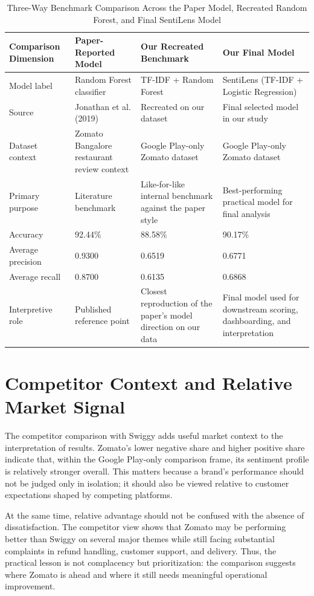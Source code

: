 \begin{table}[h]
\centering
\caption{Three-Way Benchmark Comparison Across the Paper Model, Recreated Random Forest, and Final SentiLens Model}
\small
\begin{tabular}{L{0.26\textwidth}L{0.18\textwidth}L{0.18\textwidth}L{0.20\textwidth}}
\toprule
\textbf{Comparison Dimension} & \textbf{Paper-Reported Model} & \textbf{Our Recreated Benchmark} & \textbf{Our Final Model} \\
\midrule
Model label & Random Forest classifier & TF-IDF + Random Forest & SentiLens (TF-IDF + Logistic Regression) \\
Source & Jonathan et al. (2019) & Recreated on our dataset & Final selected model in our study \\
Dataset context & Zomato Bangalore restaurant review context & Google Play-only Zomato dataset & Google Play-only Zomato dataset \\
Primary purpose & Literature benchmark & Like-for-like internal benchmark against the paper style & Best-performing practical model for final analysis \\
Accuracy & 92.44\% & 88.58\% & 90.17\% \\
Average precision & 0.9300 & 0.6519 & 0.6771 \\
Average recall & 0.8700 & 0.6135 & 0.6868 \\
Interpretive role & Published reference point & Closest reproduction of the paper's model direction on our data & Final model used for downstream scoring, dashboarding, and interpretation \\
\bottomrule
\end{tabular}
\normalsize
\end{table}

\section{Competitor Context and Relative Market Signal}

The competitor comparison with Swiggy adds useful market context to the interpretation of results. Zomato's lower negative share and higher positive share indicate that, within the Google Play-only comparison frame, its sentiment profile is relatively stronger overall. This matters because a brand's performance should not be judged only in isolation; it should also be viewed relative to customer expectations shaped by competing platforms.

At the same time, relative advantage should not be confused with the absence of dissatisfaction. The competitor view shows that Zomato may be performing better than Swiggy on several major themes while still facing substantial complaints in refund handling, customer support, and delivery. Thus, the practical lesson is not complacency but prioritization: the comparison suggests where Zomato is ahead and where it still needs meaningful operational improvement.

